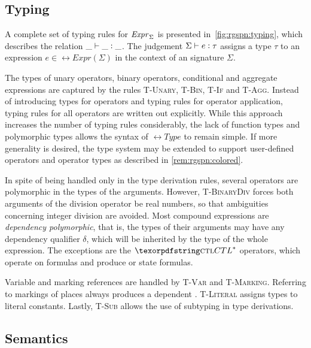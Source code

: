 \subsection{Typing}

A complete set of typing rules for \(\textrm{\itshape Expr\/}_\Sigma\) is presented in~\vref{fig:rgspn:typing}, which describes the relation \(\_ \vdash \_ \mathrel{\vcentcolon} \_\). The judgement \(\Sigma \vdash e \mathrel{\vcentcolon} \tau\) assigns a type \(\tau\) to an expression \(e \in \rel{Expr}(\Sigma)\) in the context of an  signature \(\Sigma\). 

The types of unary operators, binary operators, conditional and aggregate expressions are captured by the rules \textsc{T-Unary}, \textsc{T-Bin}, \textsc{T-If} and \textsc{T-Agg}. Instead of introducing types for operators and typing rules for operator application, typing rules for all operators are written out explicitly. While this approach increases the number of typing rules considerably, the lack of function types and polymorphic types allows the syntax of \(\rel{Type}\) to remain simple. If more generality is desired, the type system may be extended to support user-defined operators and operator types as described in \vref{rem:rgspn:colored}.

In spite of being handled only in the type derivation rules, several operators are polymorphic in the types of the arguments. However, \textsc{T-BinaryDiv} forces both arguments of the division operator be real numbers, so that ambiguities concerning integer division are avoided. Most compound expressions are \emph{dependency polymorphic}, that is, the types of their arguments may have any dependency qualifier \(\delta\), which will be inherited by the type of the whole expression. The exceptions are the \(\textabbr{CTL}^*\) operators, which operate on  formulas and produce  or  state formulas. 

Variable and marking references are handled by \textsc{T-Var} and \textsc{T-Marking}. Referring to markings of places always produces a  dependent . \textsc{T-Literal} assigns  types to literal constants. Lastly, \textsc{T-Sub} allows the use of subtyping in type derivations.

\subsection{Semantics}
\label{ssec:rgspn:semantics}

